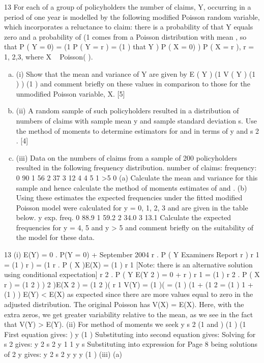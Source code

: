 \documentclass[a4paper,12pt]{article}
\begin{document}
\newpage
\newpage

\item 13
For each of a group of policyholders the number of claims, Y, occurring in a period of
one year is modelled by the following modified Poisson random variable, which
incorporates a reluctance to claim:
there is a probability of that Y equals zero and a probability of (1
comes from a Poisson distribution with mean , so that
P ( Y = 0) =
(1
P ( Y = r ) = (1
) that Y
) P ( X = 0)
) P ( X = r ), r = 1, 2,3,
where X ~ Poisson( ).
\begin{enumerate}[(a)]
\item (i)
Show that the mean and variance of Y are given by
E ( Y ) (1
V ( Y ) (1
)
) (1
)
and comment briefly on these values in comparison to those for the
unmodified Poisson variable, X.
[5]
\item (ii) A random sample of such policyholders resulted in a distribution of numbers
of claims with sample mean y and sample standard deviation s. Use the
method of moments to determine estimators for and in terms of y and s 2 .
[4]
\item (iii) Data on the numbers of claims from a sample of 200 policyholders resulted in
the following frequency distribution.
number of claims:
frequency:
0
90
1
56
2
37
3
12
4
4
5
1
>5
0
(a) Calculate the mean and variance for this sample and hence calculate
the method of moments estimates of and .
(b) Using these estimates the expected frequencies under the fitted
modified Poisson model were calculated for y = 0, 1, 2, 3 and are given
in the table below.
y exp. freq.
0 88.9
1 59.2
2 34.0
3 13.1
Calculate the expected frequencies for y = 4, 5 and y > 5 and comment
briefly on the suitability of the model for these data.
\end{enumerate}

13
(i)
E(Y) = 0 . P(Y = 0) +
September 2004
r . P ( Y
Examiners Report
r )
r 1
= (1
)
r ) = (1
r . P ( X
)E(X) = (1
)
r 1
[Note: there is an alternative solution using conditional expectation]
r 2 . P ( Y
E(Y 2 ) = 0 +
r )
r 1
= (1
)
r 2 . P ( X r ) = (1
2 ) ) 2
)E(X 2 ) = (1
2
)(
r 1
V(Y) = (1
)(
= (1
)
(1 +
(1
2
= (1
)
{1 +
(1
)
}
)
E(Y) < E(X) as expected since there are more values equal to zero in the
adjusted distribution.
The original Poisson has V(X) = E(X). Here, with the extra zeros, we get
greater variability relative to the mean, as we see in the fact that V(Y) > E(Y).
(ii)
For method of moments we seek
y
s 2
(1
and
)
(1
) (1
First equation gives:
)
y
(1
)
Substituting into second equation gives:
Solving for
s 2
gives:
y
2
s 2
y
1
1
y
s
Substituting into expression for
Page 8
being solutions of
2
y
gives:
y 2
s 2
y
y
y
(1
)
(iii)
(a)
\end{document}
